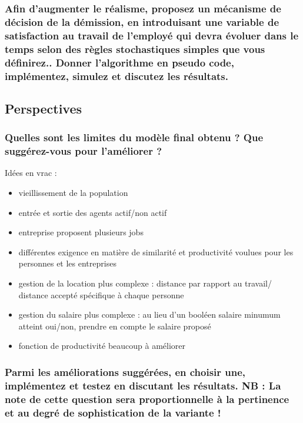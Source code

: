 \documentclass[10pt,a4paper]{article}
\begin{document}
    \subsubsection{Afin d'augmenter le réalisme, proposez un mécanisme de décision de la démission, en introduisant une variable de satisfaction au travail de l'employé qui devra évoluer dans le temps selon des règles stochastiques simples que vous définirez.. Donner l'algorithme en pseudo code, implémentez, simulez et discutez les résultats.}
    
    \subsection{Perspectives}
    
    \subsubsection{Quelles sont les limites du modèle final obtenu ? Que suggérez-vous pour l'améliorer ?}
  Idées en vrac :
   \begin{itemize}
    \item vieillissement de la population
    \item entrée et sortie des agents actif/non actif
    \item entreprise proposent plusieurs jobs
    \item différentes exigence en matière de similarité et productivité voulues pour les personnes et les entreprises
    \item gestion de la location plus complexe : distance par rapport au travail/ distance accepté spécifique à chaque personne
    \item gestion du salaire plus complexe : au lieu d'un booléen salaire minumum atteint oui/non, prendre en compte le salaire proposé
    \item fonction de productivité  beaucoup à améliorer
    \end{itemize}
    
    \subsubsection{Parmi les améliorations suggérées, en choisir une, implémentez et testez en discutant les résultats. NB : La note de cette question sera proportionnelle à la pertinence et au degré de sophistication de la variante !}
    
\end{document}
